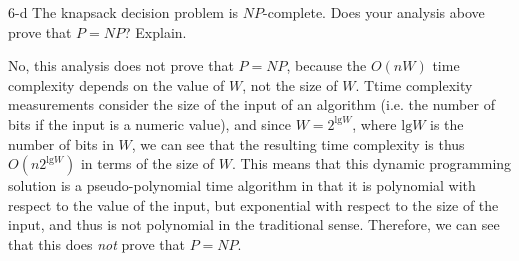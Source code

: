 \documentclass[11pt]{article}
\newcommand{\tlg}{\text{lg}}
\begin{document}
\begin{prob}{6-d}
The knapsack decision problem is $NP$-complete. Does your analysis above prove that $P = NP$? Explain.
\end{prob}
\begin{sol}
No, this analysis does not prove that $P = NP$, because the $O(nW)$ time complexity depends on the value of $W$, not the size of $W$. Ttime complexity measurements consider the size of the input of an algorithm (i.e. the number of bits if the input is a numeric value), and since $W = 2^{\tlg W}$, where $\tlg W$ is the number of bits in $W$, we can see that the resulting time complexity is thus $O(n2^{\tlg W})$ in terms of the size of $W$. This means that this dynamic programming solution is a pseudo-polynomial time algorithm in that it is polynomial with respect to the value of the input, but exponential with respect to the size of the input, and thus is not polynomial in the traditional sense. Therefore, we can see that this does \emph{not} prove that $P = NP$.

\end{sol}
\end{document}
